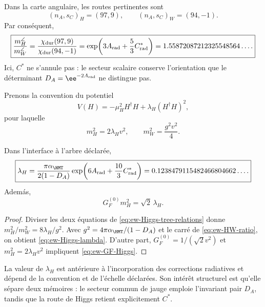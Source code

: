 Dans la carte angulaire, les routes pertinentes sont
\begin{equation}
\label{eq:ew-HW-signatures}
(n_A,s_C)_H=(97,9),
\qquad
(n_A,s_C)_W=(94,-1).
\end{equation}
Par conséquent,
\begin{equation}
\label{eq:ew-HW-ratio}
\boxed{
\frac{m_H^{\angle}}{m_W^{\angle}}
=\frac{\chi_{\rm dur}(97,9)}{\chi_{\rm dur}(94,-1)}
=\exp\!\left(3A_{\rm rad}+\frac53C^*_{\rm rad}\right)
=1.55872087212325548564\ldots .}
\end{equation}
Ici, \(C^*\) ne s'annule pas : le secteur scalaire conserve l'orientation
que le déterminant \(D_A=\ee^{-2A_{\rm rad}}\) ne distingue pas.

Prenons la convention du potentiel
\begin{equation}
\label{eq:ew-Higgs-potential}
V(H)=-\mu_H^2H^\dagger H
+\lambda_H(H^\dagger H)^2,
\end{equation}
pour laquelle
\begin{equation}
\label{eq:ew-Higgs-tree-relations}
m_H^2=2\lambda_Hv^2,
\qquad
m_W^2=\frac{g^2v^2}{4}.
\end{equation}

\begin{corollary}
\label{cor:ew-Higgs-lambda}
Dans l'interface à l'arbre déclarée,
\begin{equation}
\label{eq:ew-Higgs-lambda}
\boxed{
\lambda_H
=\frac{\pi\alpha_{\HMT}}{2(1-D_A)}
\exp\!\left(6A_{\rm rad}+\frac{10}{3}C^*_{\rm rad}\right)
=0.1238479115482466804662\ldots .}
\end{equation}
Adem\'as,
\begin{equation}
\label{eq:ew-GF-Higgs}
G_F^{(0)}m_H^2=\sqrt2\,\lambda_H.
\end{equation}
\end{corollary}

\begin{proof}
Diviser les deux équations de
\cref{eq:ew-Higgs-tree-relations} donne
\(m_H^2/m_W^2=8\lambda_H/g^2\). Avec
\(g^2=4\pi\alpha_{\HMT}/(1-D_A)\) et le carré de
\cref{eq:ew-HW-ratio}, on obtient \cref{eq:ew-Higgs-lambda}. D'autre part,
\(G_F^{(0)}=1/(\sqrt2v^2)\) et
\(m_H^2=2\lambda_Hv^2\) impliquent
\cref{eq:ew-GF-Higgs}.
\end{proof}

La valeur de \(\lambda_H\) est antérieure à l'incorporation des corrections
radiatives et dépend de
la convention et de l'échelle déclarées. Son intérêt structurel est qu'elle
sépare deux mémoires : le secteur commun de jauge emploie l'invariant pair \(D_A\),
tandis que la route de Higgs retient explicitement \(C^*\).

